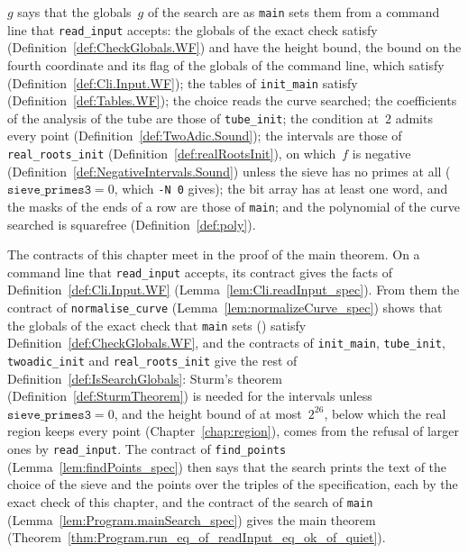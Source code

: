 \begin{definition}\label{def:IsSearchGlobals}
  \leanok
   $g$ says that the globals~$g$ of the search are as \texttt{main}
  sets them from a command line that \texttt{read\_input} accepts: the globals of the exact check
  satisfy  (Definition~\ref{def:CheckGlobals.WF}) and have the height
  bound, the bound on the fourth coordinate and its flag of the globals of the command line, which
  satisfy  (Definition~\ref{def:Cli.Input.WF}); the tables of
  \texttt{init\_main} satisfy  (Definition~\ref{def:Tables.WF}); the choice
  reads the curve searched; the coefficients of the analysis of the tube are those of
  \texttt{tube\_init}; the condition at~$2$ admits every point (Definition~\ref{def:TwoAdic.Sound});
  the intervals are those of \texttt{real\_roots\_init} (Definition~\ref{def:realRootsInit}), on
  which~$f$ is negative (Definition~\ref{def:NegativeIntervals.Sound}) unless the sieve has no
  primes at all ($\mathtt{sieve\_primes3} = 0$, which \texttt{-N 0} gives); the bit array has at least one word, and the masks of the ends of a row are those of
  \texttt{main}; and the polynomial of the curve searched is squarefree (Definition~\ref{def:poly}).
\end{definition}

The contracts of this chapter meet in the proof of the main theorem. On a command line that
\texttt{read\_input} accepts, its contract gives the facts of Definition~\ref{def:Cli.Input.WF}
(Lemma~\ref{lem:Cli.readInput_spec}). From them the contract of \texttt{normalise\_curve}
(Lemma~\ref{lem:normalizeCurve_spec}) shows that the globals of the exact check that \texttt{main}
sets () satisfy Definition~\ref{def:CheckGlobals.WF}, and the
contracts of \texttt{init\_main}, \texttt{tube\_init}, \texttt{twoadic\_init} and
\texttt{real\_roots\_init} give the rest of Definition~\ref{def:IsSearchGlobals}: Sturm's theorem
(Definition~\ref{def:SturmTheorem}) is needed for the intervals unless
$\mathtt{sieve\_primes3} = 0$, and the height bound of at most~$2^{26}$, below which the real region
keeps every point (Chapter~\ref{chap:region}), comes from the refusal of larger ones by
\texttt{read\_input}. The contract of \texttt{find\_points} (Lemma~\ref{lem:findPoints_spec}) then
says that the search prints the text of the choice of the sieve and the points over the triples of
the specification, each by the exact check of this chapter, and the contract of the search of
\texttt{main} (Lemma~\ref{lem:Program.mainSearch_spec}) gives the main theorem
(Theorem~\ref{thm:Program.run_eq_of_readInput_eq_ok_of_quiet}).
